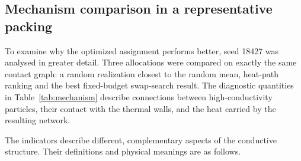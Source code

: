 \documentclass[12pt,a4paper]{article}
\begin{document}
	\subsection{Mechanism comparison in a representative packing}
	
	To examine why the optimized assignment performs better, seed 18427 was
	analysed in greater detail. Three allocations were compared on exactly the same
	contact graph: a random realization closest to the random mean, heat-path
	ranking and the best fixed-budget swap-search result. The diagnostic quantities
	in Table~\ref{tab:mechanism} describe connections between high-conductivity
	particles, their contact with the thermal walls, and the heat carried by the
	resulting network.
	
	The indicators describe different, complementary aspects of the conductive
	structure. Their definitions and physical meanings are as follows.
	
\end{document}
